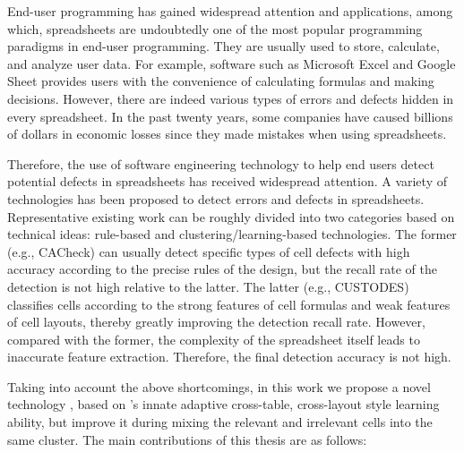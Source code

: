 \begin{englishabstract}

End-user programming has gained widespread attention and applications, among which, spreadsheets are undoubtedly one of the most popular programming paradigms in end-user programming.
They are usually used to store, calculate, and analyze user data. 
For example, software such as Microsoft Excel and Google Sheet provides users with the convenience of calculating formulas and making decisions. 
However, there are indeed various types of errors and defects hidden in every spreadsheet. 
In the past twenty years, some companies have caused billions of dollars in economic losses since they made mistakes when using spreadsheets.

Therefore, the use of software engineering technology to help end users detect potential defects in spreadsheets has received widespread attention. 
A variety of technologies has been proposed to detect errors and defects in spreadsheets. 
Representative existing work can be roughly divided into two categories based on technical ideas: rule-based and clustering/learning-based technologies. 
The former (e.g., CACheck) can usually detect specific types of cell defects with high accuracy according to the precise rules of the design, but the recall rate of the detection is not high relative to the latter.
The latter (e.g., CUSTODES) classifies cells according to the strong features of cell formulas and weak features of cell layouts, thereby greatly improving the detection recall rate. 
However, compared with the former, the complexity of the spreadsheet itself leads to inaccurate feature extraction. 
Therefore, the final detection accuracy is not high. 

Taking into account the above shortcomings, in this work we propose a novel technology \wa , based on \cu's innate adaptive cross-table, cross-layout style learning ability, but improve it during mixing the relevant and irrelevant cells into the same cluster. The main contributions of this thesis are as follows:


\end{englishabstract}
